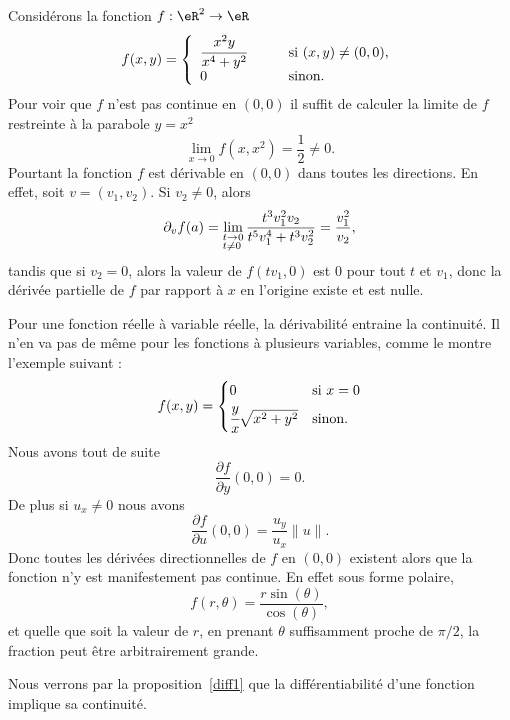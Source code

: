 \begin{example}
	Considérons la fonction \( f:\eR^2\to \eR\)
	\begin{equation}
		f(x,y)=\left\{
		\begin{array}{ll}
			\cfrac{x^2y}{x^4+y^2} \qquad & \textrm{si } (x,y)\neq (0,0), \\
			0                           & \textrm{sinon}.
		\end{array}
		\right.
	\end{equation}
	Pour voir que \( f\) n'est pas continue en \( (0,0)\) il suffit de calculer la limite de \( f\) restreinte à la parabole \( y=x^2\)
	\[
		\lim_{x\to 0} f(x,x^2)=\frac{1}{2} \neq 0.
	\]
	Pourtant la fonction \( f\) est dérivable en \( (0,0)\) dans toutes les directions. En effet, soit \( v=(v_1,v_2)\). Si \( v_2\neq 0\), alors
    \begin{equation}        \label{EQooXOCWooVbCjRd}
		\partial_v f(a)=\lim_{\begin{subarray}{l}
				t\to 0\\ t\neq 0
			\end{subarray}}
		\frac{t^3v_1^2v_2}{t^5 v_1^4+ t^3 v_2^2}=\frac{v_1^2}{v_2},
    \end{equation}
	tandis que si \( v_2=0\), alors la valeur de \( f(tv_1, 0)\)  est \( 0\) pour tout \( t\) et \( v_1\), donc la dérivée partielle de \( f\) par rapport à \( x\) en l'origine existe et est nulle.
\end{example}

\begin{example}
	Pour une fonction réelle à variable réelle, la dérivabilité entraine la continuité. Il n'en va pas de même pour les fonctions à plusieurs variables, comme le montre l'exemple suivant :
	\begin{equation}
		f(x,y)=\begin{cases}
			0                             & \text{si } x=0 \\
			\cfrac{ y }{ x }\sqrt{x^2+y^2} & \text{sinon.}
		\end{cases}
	\end{equation}
	Nous avons tout de suite
	\begin{equation}
		\frac{ \partial f }{ \partial y }(0,0)=0.
	\end{equation}
	De plus si \( u_x\neq 0\) nous avons
	\begin{equation}
		\frac{ \partial f }{ \partial u }(0,0)=\frac{ u_y }{ u_x }\| u \|.
	\end{equation}
	Donc toutes les dérivées directionnelles de \( f\) en \( (0,0)\) existent alors que la fonction n'y est manifestement pas continue. En effet sous forme polaire,
	\begin{equation}
		f(r,\theta)=\frac{ r\sin(\theta) }{ \cos(\theta) },
	\end{equation}
	et quelle que soit la valeur de \( r\), en prenant \( \theta\) suffisamment proche de \( \pi/2\), la fraction peut être arbitrairement grande.

	Nous verrons par la proposition~\ref{diff1} que la différentiabilité d'une fonction implique sa continuité.
\end{example}

